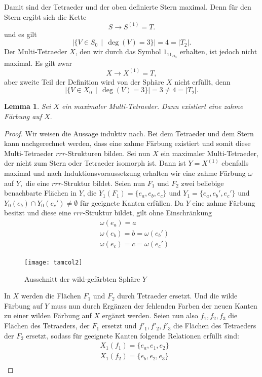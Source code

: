 \documentclass[12pt,titlepage,twoside,cleardoublepage]{article}
\theoremstyle{nummermitklammern}
\newtheorem{lemma}[temp]{Lemma}
\newtheorem{lemma}[zahl]{Lemma}
\numberwithin{equation}{section}
\begin{document}
Damit sind der Tetraeder und der oben definierte Stern maximal. 
Denn für den Stern ergibt sich die Kette 
\[
S\to S^{(1)}=T.
\]
und es gilt 
\[
\vert \{V\in S_0\,\mid \, \deg(V)=3\}\vert=4=\vert T_2\vert .
\]
Der Multi-Tetraeder $X$, den wir durch das Symbol $1_11_21_3$ erhalten, ist jedoch nicht maximal. Es gilt zwar
\[
X\to X^{(1)}=T,
\] 
aber zweite Teil der Definition wird von der Sphäre $X$ nicht erfüllt, denn 
\[
\vert \{V\in X_0\,\mid \, \deg(V)=3\}\vert=3\neq 4=\vert T_2\vert.
\]
\begin{lemma}\label{max}
Sei $X$ ein maximaler Multi-Tetraeder. Dann existiert eine zahme Färbung auf $X.$
\end{lemma}
\begin{proof}
Wir weisen die Aussage induktiv nach. Bei dem Tetraeder und dem Stern kann nachgerechnet werden, dass eine zahme Färbung existiert und somit diese Multi-Tetraeder $rrr$-Strukturen bilden. Sei nun $X$ ein maximaler Multi-Tetraeder, der nicht zum Stern oder Tetraeder isomorph ist.
 Dann ist $Y=X^{(1)}$ ebenfalls maximal und nach Induktionsvoraussetzung erhalten wir eine zahme Färbung $\omega$ auf $Y,$ die eine $rrr$-Struktur bildet. Seien nun $F_1$ und $F_2$ zwei beliebige benachbarte Flächen in $Y$, die $Y_1(F_1)=\{e_a,e_b,e_c\}$ und $Y_1=\{e_a,e_b',e_c'\}$ und $Y_0(e_b)\cap Y_0(e_c')\neq \emptyset$ für geeignete Kanten erfüllen.
Da $Y$ eine zahme Färbung besitzt und diese eine $rrr$-Struktur bildet, gilt ohne Einschränkung
\begin{align*}
&\omega(e_a)=a\\
&\omega(e_b)=b=\omega(e_b')\\
&\omega(e_c)=c=\omega(e_c')
\end{align*}
\begin{figure}[H]
\begin{center}
\texttt{[image: tamcol2]}
\end{center}
\caption{Ausschnitt der wild-gefärbten Sphäre $Y$}
\end{figure}
In $X$ werden die Flächen $F_1$ und $F_2$ durch Tetraeder ersetzt. Und die wilde Färbung auf $Y$ muss nun durch Ergänzen der fehlenden Farben der neuen Kanten zu einer wilden Färbung auf $X$ ergänzt werden. Seien nun also $f_1,f_2,f_3$ die Flächen des Tetraeders, der $F_1$ ersetzt und $f'_1,f'_2,f'_3$ die Flächen des Tetraeders der $F_2$ ersetzt, sodass für geeignete Kanten folgende Relationen erfüllt sind:
\begin{align*}
&X_1(f_1)=\{e_a,e_1,e_2\}\\
&X_1(f_2)=\{e_b,e_2,e_3\}\\

\end{align*}
\end{proof}
\end{document}
